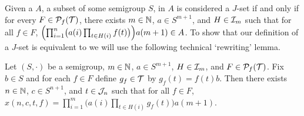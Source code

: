 Given a $A$, a subset of some semigroup $S$, in \cite[Definition 2.2(a)]{Hindman:2009vn} $A$ is considered a $J$-set if and only if for every $F \in \mathcal{P}_f(\mathcal{T})$, there exists $m \in \mathbb{N}$, $a \in S^{m+1}$, and $H \in \mathcal{I}_m$ such that for all $f \in F$, $\Bigl( \prod_{i=1}^n\bigl( a(i) \prod_{t \in H(i)} f(t) \bigr) \Bigr) a(m+1) \in A$.
To show that our definition of a $J$-set is equivalent to \cite[Definition 2.2(a)]{Hindman:2009vn} we will use the following technical `rewriting' lemma.

\begin{lem}
  \label{lem:rewrite-jset}
  Let $(S, \cdot)$ be a semigroup, $m \in \mathbb{N}$, $a \in S^{m+1}$, $H \in \mathcal{I}_m$, and $F \in \mathcal{P}_f(\mathcal{T})$. 
  Fix $b \in S$ and for each $f \in F$ define $g_f \in \mathcal{T}$ by $g_f(t) = f(t)b$. 
  Then there exists $n \in \mathbb{N}$, $c \in S^{n+1}$, and $t \in \mathcal{J}_n$ such that for all $f \in F$, $x(n, c, t, f) = \prod_{i=1}^m \bigl( a(i) \prod_{t \in H(i)} g_f(t)\big) a(m+1)$.
\end{lem}
